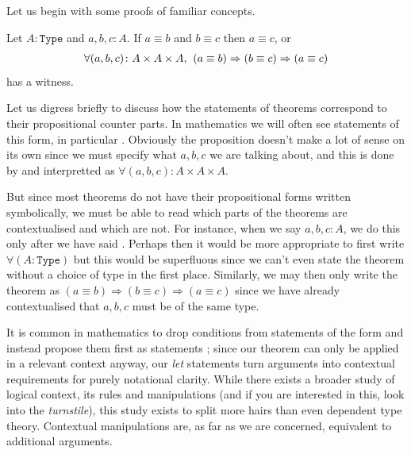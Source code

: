 \documentclass[11pt]{article}
\begin{document}
Let us begin with some proofs of familiar concepts.

\begin{theorem}
Let $A \colon \mathtt{Type}$ and $a, b ,c \colon A$. If $a \equiv b$ and $b \equiv c$ then $a \equiv c$, or \begin{gather*}
\forall (a,b,c) \colon A \times A \times A, \hspace{0.4em} (a \equiv b) \Rightarrow (b \equiv c) \Rightarrow (a \equiv c)
\end{gather*}
has a witness.
\end{theorem}

Let us digress briefly to discuss how the statements of theorems correspond to their propositional counter parts. In mathematics we will often see statements of this form, in particular . Obviously the proposition  doesn't make a lot of sense on its own since we must specify what $a,b,c$ we are talking about, and this is done by  and interpretted as $\forall (a,b,c) \colon A \times A \times A$.

But since most theorems do not have their propositional forms written symbolically, we must be able to read which parts of the theorems are contextualised and which are not. For instance, when we say $a,b,c \colon A$, we do this only after we have said . Perhaps then it would be more appropriate to first write $\forall (A \colon \mathtt{Type})$ but this would be superfluous since we can't even state the theorem without a choice of type in the first place. Similarly, we may then only write the theorem as $(a \equiv b) \Rightarrow (b \equiv c) \Rightarrow (a \equiv c)$ since we have already contextualised that $a,b,c$ must be of the same type.

It is common in mathematics to drop conditions from statements of the form  and instead propose them first as statements ; since our theorem can only be applied in a relevant context anyway, our \emph{let} statements turn arguments into contextual requirements for purely notational clarity. While there exists a broader study of logical context, its rules and manipulations (and if you are interested in this, look into the \emph{turnstile}), this study exists to split more hairs than even dependent type theory. Contextual manipulations are, as far as we are concerned, equivalent to additional  arguments.
\end{document}
